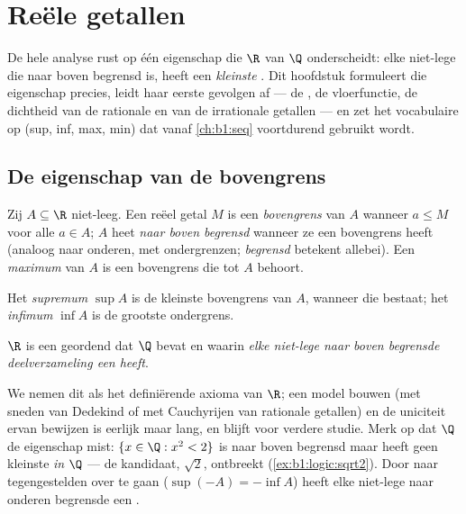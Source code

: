 \chapter{Reële getallen}\label{ch:b1:reals}

De hele analyse rust op één eigenschap die $\R$ van $\Q$ onderscheidt:
elke niet-lege  die naar boven begrensd is, heeft een
\emph{kleinste} . Dit hoofdstuk formuleert die eigenschap
precies, leidt haar eerste gevolgen af --- de ,
de vloerfunctie, de dichtheid van de rationale en van de irrationale
getallen --- en zet het vocabulaire op (sup, inf, max, min) dat vanaf
\cref{ch:b1:seq} voortdurend gebruikt wordt.

\section{De eigenschap van de bovengrens}

\begin{definition}\label{def:b1:reals:bounds}
Zij $A \subseteq \R$ niet-leeg. Een reëel getal $M$ is een
\emph{bovengrens} van $A$ wanneer $a \leq M$ voor alle
$a \in A$; $A$ heet \emph{naar boven begrensd} wanneer ze een bovengrens
heeft (analoog naar onderen, met ondergrenzen; \emph{begrensd} betekent
allebei). Een \emph{maximum} van $A$ is een bovengrens die tot $A$
behoort.

Het \emph{supremum} $\sup A$ is de kleinste bovengrens
van $A$, wanneer die bestaat; het \emph{infimum} $\inf A$
is de grootste ondergrens.
\end{definition}

\begin{theorem}\label{thm:b1:reals:sup}
$\R$ is een geordend  dat $\Q$ bevat en waarin \emph{elke
niet-lege naar boven begrensde deelverzameling een 
heeft}.
\end{theorem}
\admitted

\begin{remark}
We nemen dit als het definiërende axioma van $\R$; een model bouwen (met
sneden van Dedekind of met Cauchyrijen van rationale getallen) en de
uniciteit ervan bewijzen is eerlijk maar lang, en blijft voor verdere
studie. Merk op dat $\Q$ de eigenschap mist: $\{x \in \Q : x^2 < 2\}$ is
naar boven begrensd maar heeft geen kleinste  \emph{in $\Q$}
--- de kandidaat, $\sqrt 2$, ontbreekt (\cref{ex:b1:logic:sqrt2}). Door
naar tegengestelden over te gaan ($\sup(-A) = -\inf A$) heeft elke
niet-lege naar onderen begrensde  een .
\end{remark}

